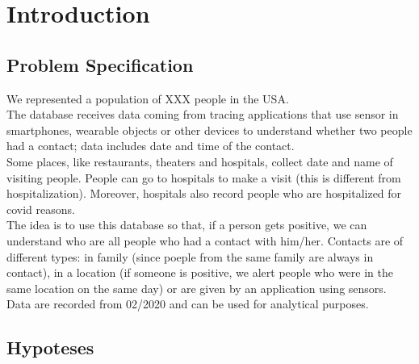 \documentclass[12pt, a4paper]{article}
\begin{document}
\clearpage

\tableofcontents

\listoftodos

\clearpage

\section{Introduction}

\subsection{Problem Specification}

We represented a population of XXX  people in 
the USA. \\
The database receives data coming from tracing applications that use sensor in 
smartphones, wearable objects or other devices to understand whether two people 
had a contact; data includes date and time of the contact. \\  
Some places, like restaurants, theaters and hospitals, collect date and name of 
visiting people. People can go to hospitals to make a visit (this is different 
from hospitalization). Moreover, hospitals also record people who are 
hospitalized for covid reasons. \\
The idea is to use this database so that, if a person gets positive, we can 
understand who are all people who had a contact with him/her. Contacts are of 
different types: in family (since poeple from the same family are always in 
contact), in a location (if someone is positive, we alert people who were in 
the same location on the same day) or are given by an application using sensors. 
Data are recorded from 02/2020 and can be used for analytical purposes. 

\subsection{Hypoteses}
\end{document}
